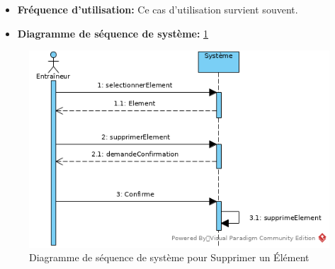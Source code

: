 \begin{itemize}
\begin{itemize}
            \item \textbf{Erreur: l'\'el\'ement a \'et\'e modifi\'ee ailleurs:} Si l'\'el\'ement \`a supprimer a \'et\'e modifi\'ee ailleurs, un message d'erreur est affich\'e et la suppression est annul\'ee.
        \end{itemize}
    \item \textbf{Fréquence d'utilisation:} Ce cas d'utilisation survient souvent.
    \item \textbf{Diagramme de s\'equence de syst\`eme:} \ref{fig:ssd_supprimer_element}
\end{itemize}

\begin{figure}[htpb]
    \centering
    \includegraphics[scale=0.5]{fig/ssd_supprimer_element.png}
    \caption{Diagramme de s\'equence de syst\`eme pour Supprimer un \'El\'ement}
    \label{fig:ssd_supprimer_element}
\end{figure}
\newpage




